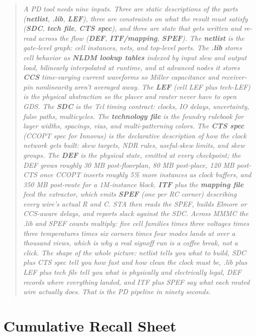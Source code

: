 \bigskip
\begin{quote}\itshape
A PD tool needs nine inputs. Three are static descriptions of the parts (\textbf{netlist}, \textbf{.lib}, \textbf{LEF}), three are constraints on what the result must satisfy (\textbf{SDC}, \textbf{tech file}, \textbf{CTS spec}), and three are state that gets written and re-read across the flow (\textbf{DEF}, \textbf{ITF/mapping}, \textbf{SPEF}). The \textbf{netlist} is the gate-level graph: cell instances, nets, and top-level ports. The \textbf{.lib} stores cell behavior as \textbf{NLDM lookup tables} indexed by input slew and output load, bilinearly interpolated at runtime, and at advanced nodes it stores \textbf{CCS} time-varying current waveforms so Miller capacitance and receiver-pin nonlinearity aren't averaged away. The \textbf{LEF} (cell LEF plus tech-LEF) is the physical abstraction so the placer and router never have to open GDS. The \textbf{SDC} is the Tcl timing contract: clocks, IO delays, uncertainty, false paths, multicycles. The \textbf{technology file} is the foundry rulebook for layer widths, spacings, vias, and multi-patterning colors. The \textbf{CTS spec} (CCOPT spec for Innovus) is the declarative description of how the clock network gets built: skew targets, NDR rules, useful-skew limits, and skew groups. The \textbf{DEF} is the physical state, emitted at every checkpoint; the DEF grows roughly 30 MB post-floorplan, 80 MB post-place, 120 MB post-CTS once CCOPT inserts roughly 5\% more instances as clock buffers, and 350 MB post-route for a 1M-instance block. \textbf{ITF} plus the \textbf{mapping file} feed the extractor, which emits \textbf{SPEF} (one per RC corner) describing every wire's actual R and C. STA then reads the SPEF, builds Elmore or CCS-aware delays, and reports slack against the SDC. Across MMMC the .lib and SPEF counts multiply: five cell families times three voltages times three temperatures times six corners times four modes lands at over a thousand views, which is why a real signoff run is a coffee break, not a click. The shape of the whole picture: netlist tells you what to build, SDC plus CTS spec tell you how fast and how clean the clock must be, .lib plus LEF plus tech file tell you what is physically and electrically legal, DEF records where everything landed, and ITF plus SPEF say what each routed wire actually does. That is the PD pipeline in ninety seconds.
\end{quote}

\chapter{Cumulative Recall Sheet}

